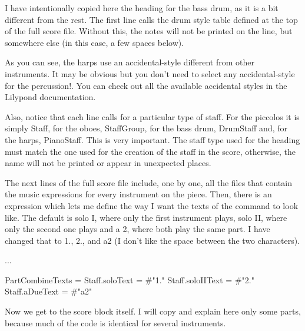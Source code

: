 \documentclass[../../LilyPond-Tutorials]{subfiles}
\begin{document}
I have intentionally copied here the heading for the bass drum, as it is a bit different from the rest.
The first line calls the drum style table defined at the top of the full score file.
Without this, the notes will not be printed on the line, but somewhere else (in this case, a few spaces below).

As you can see, the harps use an accidental-style different from other instruments.
It may be obvious but you don't need to select any accidental-style for the percussion!.
You can check out all the available accidental styles in the Lilypond documentation.

Also, notice that each line calls for a particular type of staff.
For the piccolos it is simply Staff, for the oboes, StaffGroup, for the bass drum, DrumStaff and, for the harps, PianoStaff.
This is very important.
The staff type used for the heading must match the one used for the creation of the staff in the score, otherwise, the name will not be printed or appear in unexpected places.

The next lines of the full score file include, one by one, all the files that contain the music expressions for every instrument on the piece.
Then, there is an expression which lets me define the way I want the texts of the  command to look like.
The default is solo I, where only the first instrument plays, solo II, where only the second one plays and a 2, where both play the same part.
I have changed that to 1., 2., and a2 (I don't like the space between the two characters).

\begin{lilypondcode}


...


PartCombineTexts = { %
       \set Staff.soloText = #"1."
       \set Staff.soloIIText = #"2."
       \set Staff.aDueText = #"a2"
}
\end{lilypondcode}

Now we get to the score block itself.
I will copy and explain here only some parts, because much of the code is identical for several instruments.
\end{document}
